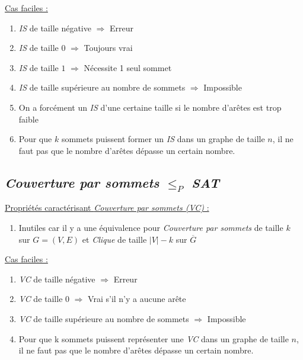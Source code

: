   \underline{Cas faciles :}
  \begin{enumerate}
   \item \emph{IS} de taille négative $\Rightarrow$ Erreur
   \item \emph{IS} de taille $0$ $\Rightarrow$ Toujours vrai
   \item \emph{IS} de taille $1$ $\Rightarrow$ Nécessite 1 seul sommet
   \item \emph{IS} de taille supérieure au nombre de sommets
	 $\Rightarrow$ Impossible
   \item On a forcément un \emph{IS} d'une certaine taille si le nombre
	 d'arêtes est trop faible
   \item Pour que $k$ sommets puissent former un \emph{IS} dans un
	 graphe de taille $n$, il ne faut pas que le nombre d'arêtes
	 dépasse un certain nombre.
  \end{enumerate}

  \subsection{\emph{Couverture par sommets} $\leq_P$ \emph{SAT}}
  \underline{Propriétés caractérisant \emph{Couverture par sommets (VC)}
  :}
  \begin{enumerate}
   \item Inutiles car il y a une équivalence pour \emph{Couverture par
	 sommets} de taille $k$ sur $G = (V,E)$ et \emph{Clique} de
	 taille $|V|-k$ sur $\overline{G}$
  \end{enumerate}

  \underline{Cas faciles :}
  \begin{enumerate}
   \item \emph{VC} de taille négative $\Rightarrow$ Erreur
   \item \emph{VC} de taille $0$ $\Rightarrow$ Vrai s'il n'y a aucune
	 arête
   \item \emph{VC} de taille supérieure au nombre de sommets
	 $\Rightarrow$ Impossible 
   \item Pour que k sommets puissent représenter une \emph{VC} dans un
	 graphe de taille $n$, il ne faut pas que le nombre d'arêtes
	 dépasse un certain nombre.
  \end{enumerate}


